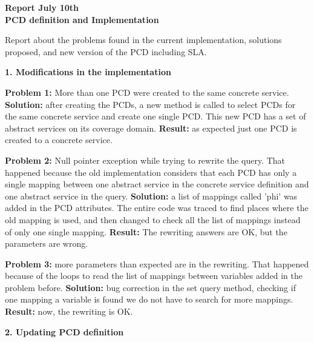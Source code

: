 \documentclass[12pt,a4paper,oneside]{report}
\begin{document}
\begin{center}
\textbf{\large{Report July 10th}} \\
\textbf{\large{PCD definition and Implementation}}
\end{center}

Report about the problems found in the current implementation, solutions proposed, and new version of the PCD including SLA.
\bigskip

\begin{flushleft}
\textbf{ 1. Modifications in the implementation}
\end{flushleft}

\textbf{Problem 1:}  More than one PCD were created to the same concrete service. 
\textbf{Solution:} after creating the PCDs, a new method is called to select PCDs for the same concrete service and create one single PCD. This new PCD has a set of abstract services on its coverage domain. \textbf{Result:} as expected just one PCD is created to a concrete service. 

\bigskip
\textbf{Problem 2:} Null pointer exception while trying to rewrite the query. That happened because the old implementation considers that each PCD has only a single mapping between one abstract service in the concrete service definition and one abstract service in the query. \textbf{Solution:} a list of mappings called 'phi' was added in the PCD attributes. The entire code was traced to find places where the old mapping is used, and then changed to check all the list of mappings instead of only one single mapping. \textbf{Result:} The rewriting answers are OK, but the parameters are wrong.

\bigskip
\textbf{Problem 3:} more parameters than expected are in the rewriting. That happened because of the loops to read the list of mappings between variables added in the problem before. \textbf{Solution:} bug correction in the set query method, checking if one mapping a variable is found we do not have to search for more mappings. \textbf{Result:} now, the rewriting is OK.

\begin{flushleft}
\textbf{2. Updating PCD definition}
\end{flushleft}
\end{document}
